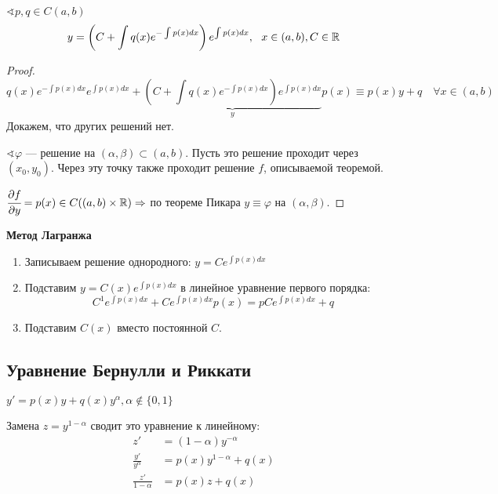 

\cfoot{}

\setcounter{section}{2}
\setcounter{subsection}{4}



\begin{theorem}
    $\sphericalangle p, q \in C(a, b)$
    $$y = \left( C + \int q(x) e^{-\int p(x)dx} \right)e^{\int p(x)dx}, \ \ x\in(a, b), C\in\mathbb{R}$$
\end{theorem}
\begin{proof}
    $$q(x) e^{-\int p(x)dx} e^{\int p(x)dx} + \underbrace{\left(C + \int q(x) e^{-\int p(x)dx}\right) e^{\int p(x)dx}}_{y} p(x) \equiv p(x) y + q \quad \forall x\in(a, b)$$
    Докажем, что других решений нет.

    $\sphericalangle \varphi$ --- решение на $(\alpha, \beta)\subset(a, b)$. Пусть это решение проходит через $(x_0, y_0)$. Через эту точку также проходит решение $f$, описываемой теоремой.

    $\cfrac{\partial f}{\partial y} = p(x) \in C((a, b)\times \mathbb{R}) \Rightarrow$ по теореме Пикара $y \equiv \varphi$ на $(\alpha, \beta)$.
\end{proof}

\textbf{Метод Лагранжа}
\begin{enumerate}
    \item Записываем решение однородного: $y = Ce^{\int p(x) dx}$
    \item Подставим $y = C(x) e^{\int p(x) dx}$ в линейное уравнение первого порядка:
          $$C^1 e^{\int p(x)dx} + Ce^{\int p(x)dx} p(x) = pCe^{\int p(x)dx} + q$$
    \item Подставим $C(x)$ вместо постоянной $C$.
\end{enumerate}

\subsection{Уравнение Бернулли и Риккати}

\begin{definition}
    $y' = p(x) y + q(x) y^\alpha, \alpha\not\in\{0, 1\}$
\end{definition}
Замена $z=y^{1-\alpha}$ сводит это уравнение к линейному:
\begin{align*}
    z'                  & = (1-\alpha)y^{-\alpha}    \\
    \frac{y'}{y^\alpha} & = p(x) y^{1-\alpha} + q(x) \\
    \frac{z'}{1-\alpha} & = p(x) z + q(x)
\end{align*}

